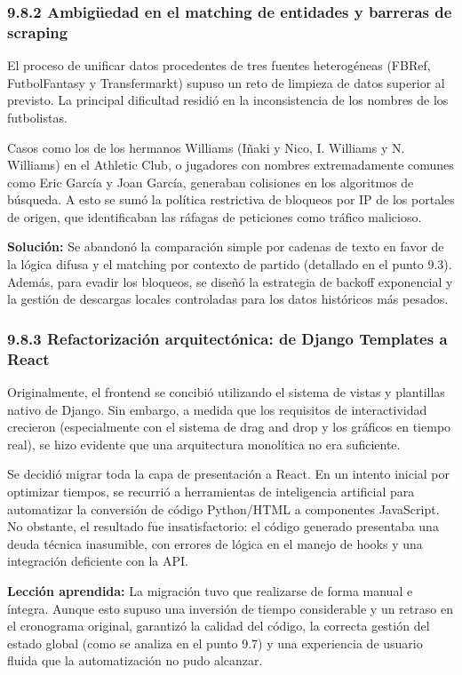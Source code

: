 \subsubsection{9.8.2 Ambigüedad en el matching de entidades y barreras de scraping}
El proceso de unificar datos procedentes de tres fuentes heterogéneas (FBRef, FutbolFantasy y Transfermarkt) supuso un reto de limpieza de datos superior al previsto. La principal
dificultad residió en la inconsistencia de los nombres de los futbolistas.
 
Casos como los de los hermanos Williams (Iñaki y Nico, I. Williams y N. Williams) en el Athletic Club, o jugadores con nombres extremadamente comunes como Eric García y Joan García, generaban colisiones en los algoritmos de búsqueda.
A esto se sumó la política restrictiva de bloqueos por IP de los portales de origen, que identificaban las ráfagas de peticiones como tráfico malicioso.
 
\textbf{Solución:} Se abandonó la comparación simple por cadenas de texto en favor de la lógica difusa y el matching por contexto de partido (detallado en el punto 9.3). Además, para evadir los bloqueos, se diseñó
la estrategia de backoff exponencial y la gestión de descargas locales controladas para los datos históricos más pesados.
 
\subsubsection{9.8.3 Refactorización arquitectónica: de Django Templates a React}
Originalmente, el frontend se concibió utilizando el sistema de vistas y plantillas nativo de Django. Sin embargo, a medida que los requisitos de interactividad crecieron (especialmente con el sistema de drag and drop
y los gráficos en tiempo real), se hizo evidente que una arquitectura monolítica no era suficiente.
 
Se decidió migrar toda la capa de presentación a React. En un intento inicial por optimizar tiempos, se recurrió a herramientas de inteligencia artificial para automatizar la conversión de código Python/HTML a
componentes JavaScript. No obstante, el resultado fue insatisfactorio: el código generado presentaba una deuda técnica inasumible, con errores de lógica en el manejo de hooks y una integración deficiente con la API.
 
\textbf{Lección aprendida:} La migración tuvo que realizarse de forma manual e íntegra. Aunque esto supuso una inversión de tiempo considerable y un retraso en el cronograma original, garantizó la calidad del código,
la correcta gestión del estado global (como se analiza en el punto 9.7) y una experiencia de usuario fluida que la automatización no pudo alcanzar.
 
